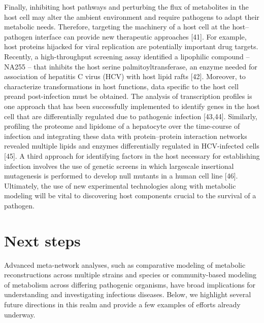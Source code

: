 Finally, inhibiting host pathways and perturbing the flux of 
metabolites in the host cell may alter the ambient environment 
and require pathogens to adapt their metabolic needs. Therefore, 
targeting the machinery of a host cell at the host–pathogen 
interface can provide new therapeutic approaches [41]. For 
example, host proteins hijacked for viral replication are 
potentially important drug targets. Recently, a high-throughput 
screening assay identified a lipophilic compound – NA255 – that 
inhibits the host serine palmitoyltransferase, an enzyme 
needed for association of hepatitis C virus (HCV) with host 
lipid rafts [42]. Moreover, to characterize transformations 
in host functions, data specific to the host cell preand 
post-infection must be obtained. The analysis of transcription 
profiles is one approach that has been successfully implemented 
to identify genes in the host cell that are differentially 
regulated due to pathogenic infection [43,44]. Similarly, 
profiling the proteome and lipidome of a hepatocyte over 
the time-course of infection and integrating these data with 
protein–protein interaction networks revealed multiple 
lipids and enzymes differentially regulated in HCV-infected 
cells [45]. A third approach for identifying factors in the 
host necessary for establishing infection involves the use 
of genetic screens in which largescale insertional mutagenesis 
is performed to develop null mutants in a human cell line [46]. 
Ultimately, the use of new experimental technologies along 
with metabolic modeling will be vital to discovering host 
components crucial to the survival of a pathogen.

\section{Next steps}

Advanced meta-network analyses, such as comparative modeling 
of metabolic reconstructions across multiple strains and 
species or community-based modeling of metabolism across 
differing pathogenic organisms, have broad implications 
for understanding and investigating infectious diseases. 
Below, we highlight several future directions in this 
realm and provide a few examples of efforts already underway.

